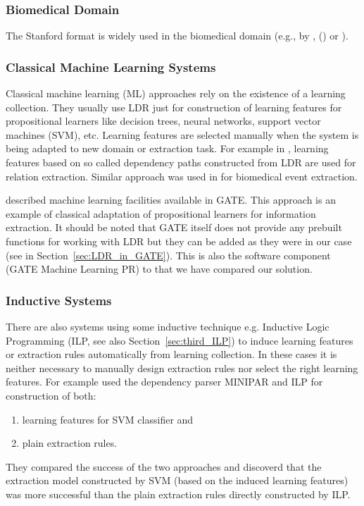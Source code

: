 \subsubsection{Biomedical Domain}

The
Stanford format is widely used in the biomedical
domain (e.g., by \cite{MiyaoACL2008}, (\cite{Yakushiji2001}) or
\cite{Clegg2005Evaluating}).



\subsubsection{Classical Machine Learning Systems}

Classical machine learning (ML) approaches rely on the existence of a learning collection. They usually use LDR just for construction of learning features for propositional learners like decision trees, neural networks, support vector machines (SVM), etc. Learning features are selected manually when the system is being adapted to new domain or extraction task. For example in \citep{Bunescu:DependencyPaths}, learning features based on so called dependency paths constructed from LDR are used for relation extraction. Similar approach was used in \citep{Buyko:dependencyGraphs} for biomedical event extraction.


\citep{Yaoyong09a} described machine learning facilities available in GATE. This approach is an example of classical adaptation of propositional learners for information extraction. It should be noted that GATE itself does not provide any prebuilt functions for working with LDR but they can be added as they were in our case (see in Section~\ref{sec:LDR_in_GATE}). This is also the software component (GATE Machine Learning PR) to that we have compared our solution. 


\subsubsection{Inductive Systems}

There are also systems using some inductive technique e.g. Inductive Logic Programming (ILP, see also Section~\ref{sec:third_ILP}) to induce learning features or extraction rules automatically from learning collection. In these cases it is neither necessary to manually design extraction rules nor select the right learning features. For example \cite{DBLP:conf/ilp/RamakrishnanJBS07} used the dependency parser MINIPAR \citep{minipar} and ILP for construction of both:
\begin{enumerate}
	\item learning features for SVM classifier and
	\item plain extraction rules.
\end{enumerate}
They compared the success of the two approaches and discoverd that the extraction model constructed by SVM (based on the induced learning features) was more successful than the plain extraction rules directly constructed by ILP.




